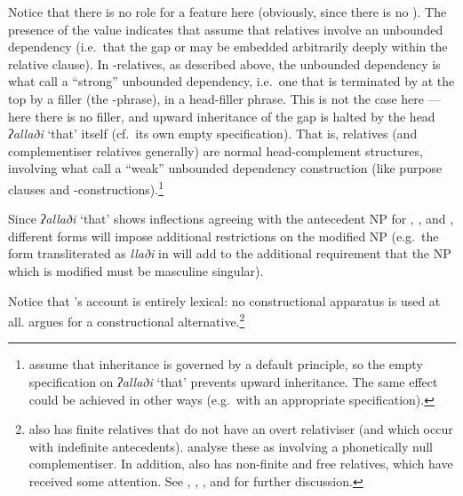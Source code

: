 \documentclass[output=paper,biblatex,babelshorthands,newtxmath,draftmode,colorlinks,citecolor=brown]{langscibook}
\begin{document}
Notice that there is no role for a  feature here (obviously, since there is no
).  The presence of the  value indicates that
\citeauthor{Alqurashi:Borsley:12} assume that  relatives involve an unbounded
dependency (i.e.\ that the gap or  may be embedded arbitrarily
deeply within the relative clause). In -relatives, as described above, the
unbounded dependency is what \citet[155]{Pollard:Sag:94} call a ``strong'' unbounded
dependency, i.e.\ one that is terminated by at the top by
a filler (the -phrase), in a head-filler phrase. This is not the case here ---
here there is no filler, and upward inheritance of the gap is halted by the head
\emph{ʔallaði} `that' itself (cf.\ its own empty  specification). That is,
 relatives (and complementiser relatives generally) are normal head-complement
structures, involving what \citet[]{Pollard:Sag:94} call a ``weak''
unbounded dependency construction (like 
purpose clauses and -constructions).\footnote{\citet[42]{Alqurashi:Borsley:12}
  assume that  inheritance is governed by a default principle, so the
  empty  specification on \emph{ʔallaði} `that' prevents upward
  inheritance. The same effect could be achieved in other ways (e.g.\ with an appropriate 
  specification). }


Since \emph{ʔallaði} `that' shows inflections agreeing with the antecedent NP for
, , and , different forms will impose
additional restrictions on the modified NP (e.g.\ the form transliterated as
\emph{llaði} in  will add to  the additional requirement that
the NP which is modified must be masculine singular).

Notice that \citeauthor{Alqurashi:Borsley:12}'s account is entirely lexical: no
constructional apparatus is used at all. \citet{Hahn:12} argues for a constructional
alternative.\footnote{ also has finite relatives that do not have an overt
  relativiser (and which occur with indefinite
  antecedents). \citeauthor{Alqurashi:Borsley:12} analyse these as involving a
  phonetically null complementiser. In addition,  also has non-finite and free
  relatives, which have received some attention. See \citet{Melnik:06},
  \citet{Haddar:Boukedi:09,Zalila:Haddar:11}, \citet{Hahn:12}, and \citet{Crysmann:Reintges:14}
  for further discussion.}
\end{document}
